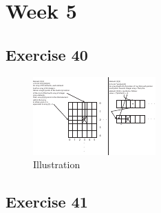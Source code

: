 \documentclass[a4paper]{article}
\let\stdsection\section
\renewcommand\section{\newpage\stdsection}
\begin{document}
\section*{Week 5}

\subsection*{Exercise 40}

\begin{figure}[H]
\centerline{\includegraphics[trim={0 0cm 0 0cm}, scale=5]{../40/illustration.pdf}}
\caption{Illustration}
\end{figure}

\subsection*{Exercise 41}












\end{document}
